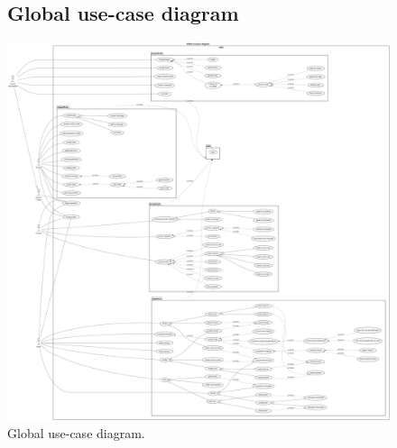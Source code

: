 \documentclass[]{uc2pfecaneva}
\begin{document}
    \begin{figure}[ht]

        \subsection{Global use-case diagram}

        \centering
        \includegraphics[width=\textwidth]{images/GUCD}

        \caption{Global use-case diagram.}
    \end{figure}
    \clearpage
\end{document}
